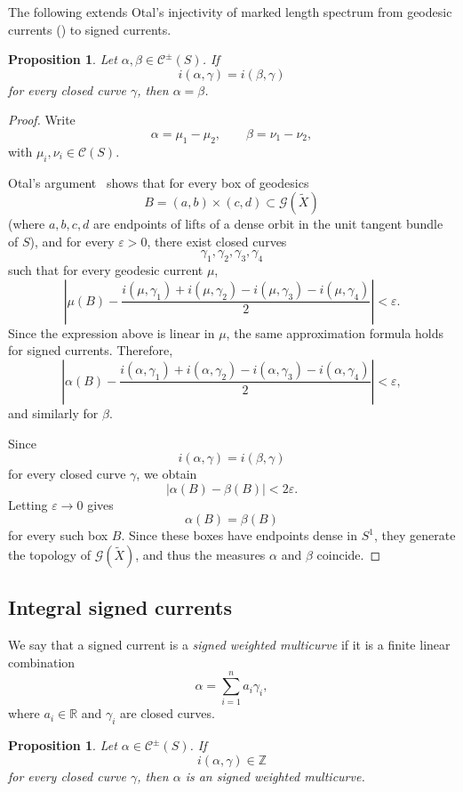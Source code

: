 \documentclass[12pt]{amsart}
\numberwithin{equation}{section}
\numberwithin{figure}{section}
\newtheorem{proposition}[equation]{Proposition}
\theoremstyle{definition}
\theoremstyle{plain}
\newcommand*{\wt}[1]{\widetilde{#1}}
\begin{document}
The following extends Otal's injectivity of marked length spectrum from geodesic currents (\cite[Th\'eor\`eme~2]{Otal90:SpectreMarqueNegative}) to signed currents.

\begin{proposition}\label{prop:signed_otal}
Let $\alpha,\beta\in \mathcal C^\pm(S)$.
If
\[
i(\alpha,\gamma)=i(\beta,\gamma)
\]
for every closed curve $\gamma$, then $\alpha=\beta$.
\end{proposition}

\begin{proof}
Write
\[
\alpha=\mu_1-\mu_2,
\qquad
\beta=\nu_1-\nu_2,
\]
with $\mu_i,\nu_i\in \mathcal C(S)$.

Otal's argument~\cite{Otal90:SpectreMarqueNegative} shows that for every box of geodesics
\[
B=(a,b)\times(c,d)\subset \mathcal{G}(\widetilde X)
\]
(where $a,b,c,d$ are endpoints of lifts of a dense orbit in the unit tangent bundle of $S$),
and for every $\varepsilon>0$, there exist closed curves
\[
\gamma_1,\gamma_2,\gamma_3,\gamma_4
\]
such that for every geodesic current $\mu$,
\[
\left|
\mu(B)
-
\frac{
i(\mu,\gamma_1)
+i(\mu,\gamma_2)
-i(\mu,\gamma_3)
-i(\mu,\gamma_4)
}{2}
\right|
<\varepsilon.
\]
Since the expression above is linear in $\mu$, the same approximation formula holds for signed currents. Therefore,
\[
\left|
\alpha(B)
-
\frac{
i(\alpha,\gamma_1)
+i(\alpha,\gamma_2)
-i(\alpha,\gamma_3)
-i(\alpha,\gamma_4)
}{2}
\right|
<\varepsilon,
\]
and similarly for $\beta$.

Since
\[
i(\alpha,\gamma)=i(\beta,\gamma)
\]
for every closed curve $\gamma$, we obtain
\[
|\alpha(B)-\beta(B)|<2\varepsilon.
\]
Letting $\varepsilon\to0$ gives
\[
\alpha(B)=\beta(B)
\]
for every such box $B$.
Since these boxes have endpoints dense in $S^1$, they generate the topology of $\mathcal{G}(\wt{X})$, and thus the measures $\alpha$ and $\beta$ coincide.
\end{proof}

\subsection{Integral signed currents}

We say that a signed current is a \emph{signed weighted multicurve} if it is a finite linear combination
\[
\alpha=\sum_{i=1}^n a_i\gamma_i,
\]
where $a_i\in\mathbb R$ and $\gamma_i$ are closed curves.

\begin{proposition}\label{prop:signed_multicurves}
Let $\alpha\in \mathcal C^\pm(S)$.
If
\[
i(\alpha,\gamma)\in\mathbb Z
\]
for every closed curve $\gamma$, then $\alpha$ is an signed weighted multicurve.
\end{proposition}
\end{document}
